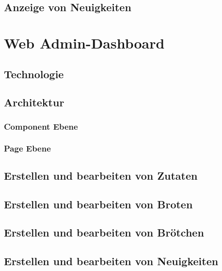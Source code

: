 \clearpage

\subsection{Anzeige von Neuigkeiten}

\clearpage

\section{Web Admin-Dashboard}

\subsection{Technologie}

\clearpage

\subsection{Architektur}

\subsubsection{Component Ebene}

\clearpage

\subsubsection{Page Ebene}

\clearpage

\subsection{Erstellen und bearbeiten von Zutaten}

\clearpage

\subsection{Erstellen und bearbeiten von Broten}

\clearpage

\subsection{Erstellen und bearbeiten von Brötchen}

\clearpage

\subsection{Erstellen und bearbeiten von Neuigkeiten}

\clearpage